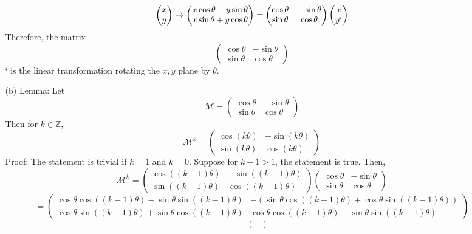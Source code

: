 \documentclass[12pt]{article}
\begin{document}
\begin{itemize}
\begin{itemize}
$$\begin{pmatrix}
x \\
y
\end{pmatrix} \mapsto \begin{pmatrix}
x\cos\theta - y\sin\theta \\
x\sin\theta + y\cos\theta
\end{pmatrix} = \begin{pmatrix}
\cos\theta & -\sin\theta \\
\sin\theta & \cos\theta
\end{pmatrix}\begin{pmatrix}
x \\
y`
\end{pmatrix}$$
Therefore, the matrix
$$\begin{pmatrix}
\cos\theta & -\sin\theta \\
\sin\theta & \cos\theta
\end{pmatrix}$$`
is the linear transformation rotating the $x, y$ plane by $\theta$.
\item[(b)]
Lemma: Let
$$\mathcal{M} = \begin{pmatrix}
\cos\theta & -\sin\theta \\
\sin\theta & \cos\theta
\end{pmatrix}$$
Then for $k \in\mathbb{Z}$, $$\mathcal{M}^k = \begin{pmatrix}
\cos(k\theta) & -\sin(k\theta) \\
\sin(k\theta) & \cos(k\theta)
\end{pmatrix}$$
Proof: The statement is trivial if $k = 1$ and $k = 0$. Suppose for $k - 1 > 1$, the statement is true. Then,
\tiny
$$\mathcal{M}^k = \begin{pmatrix}
\cos((k-1)\theta) & -\sin((k-1)\theta) \\
\sin((k-1)\theta) & \cos((k-1)\theta)
\end{pmatrix}\begin{pmatrix}
\cos\theta & -\sin\theta \\
\sin\theta & \cos\theta
\end{pmatrix}$$
$$= \begin{pmatrix}
\cos\theta\cos((k-1)\theta) - \sin\theta\sin((k - 1)\theta) & -(\sin\theta\cos((k-1)\theta) + \cos\theta\sin((k-1)\theta)) \\
\cos\theta\sin((k-1)\theta) + \sin\theta\cos((k-1)\theta) & \cos\theta\cos((k-1)\theta) - \sin\theta\sin((k-1)\theta)
\end{pmatrix}$$
$$= \begin{pmatrix}

\end{pmatrix}$$
\end{itemize}
\end{itemize}
\end{document}
